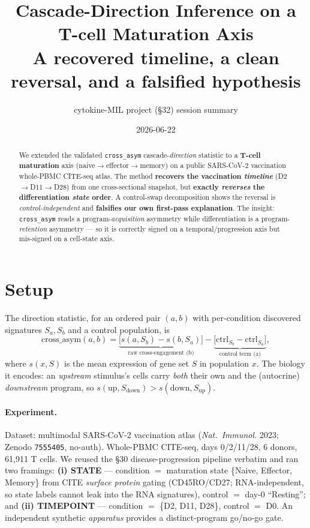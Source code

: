 \documentclass[11pt]{article}
\title{\vspace{-1.2cm}\textbf{Cascade-Direction Inference on a T-cell Maturation Axis}\\[2pt]
\large A recovered timeline, a clean reversal, and a falsified hypothesis}
\author{cytokine-MIL project (\S32) \quad\textemdash\quad session summary}
\date{2026-06-22}
\begin{document}
\maketitle
\vspace{-1.0cm}

\begin{abstract}
\noindent We extended the validated \texttt{cross\_asym} cascade-\emph{direction} statistic to a
\textbf{T-cell maturation} axis (naive$\rightarrow$effector$\rightarrow$memory) on a public
SARS-CoV-2 vaccination whole-PBMC CITE-seq atlas. The method \textbf{recovers the vaccination
\emph{timeline}} (D2$\rightarrow$D11$\rightarrow$D28) from one cross-sectional snapshot, but
\textbf{exactly \emph{reverses} the differentiation \emph{state} order}. A control-swap
decomposition shows the reversal is \emph{control-independent} and \textbf{falsifies our own
first-pass explanation}. The insight: \texttt{cross\_asym} reads a program-\emph{acquisition}
asymmetry while differentiation is a program-\emph{retention} asymmetry --- so it is correctly
signed on a temporal/progression axis but mis-signed on a cell-state axis.
\end{abstract}

\section{Setup}
The direction statistic, for an ordered pair $(a,b)$ with per-condition discovered signatures
$S_a,S_b$ and a control population, is
\begin{equation}
\mathrm{cross\_asym}(a,b)=\underbrace{\big[s(a,S_b)-s(b,S_a)\big]}_{\text{raw cross-engagement (b)}}
-\underbrace{\big[\mathrm{ctrl}_{S_b}-\mathrm{ctrl}_{S_a}\big]}_{\text{control term (a)}},
\label{eq:cross}
\end{equation}
where $s(x,S)$ is the mean expression of gene set $S$ in population $x$. The biology it encodes:
an \emph{upstream} stimulus's cells carry \emph{both} their own and the (autocrine)
\emph{downstream} program, so $s(\text{up},S_{\text{down}})>s(\text{down},S_{\text{up}})$.

\paragraph{Experiment.} Dataset: multimodal SARS-CoV-2 vaccination atlas (\emph{Nat.\ Immunol.}
2023; Zenodo \texttt{7555405}, no-auth). Whole-PBMC CITE-seq, days 0/2/11/28, 6 donors,
61{,}911 T cells. We reused the \S30 disease-progression pipeline verbatim and ran two framings:
\textbf{(i) STATE} --- condition $=$ maturation state \{Naive, Effector, Memory\} from CITE
\emph{surface protein} gating (CD45RO/CD27; RNA-independent, so state labels cannot leak into
the RNA signatures), control $=$ day-0 ``Resting''; and \textbf{(ii) TIMEPOINT} --- condition
$=$ \{D2, D11, D28\}, control $=$ D0. An independent synthetic \emph{apparatus} provides a
distinct-program go/no-go gate.
\end{document}
